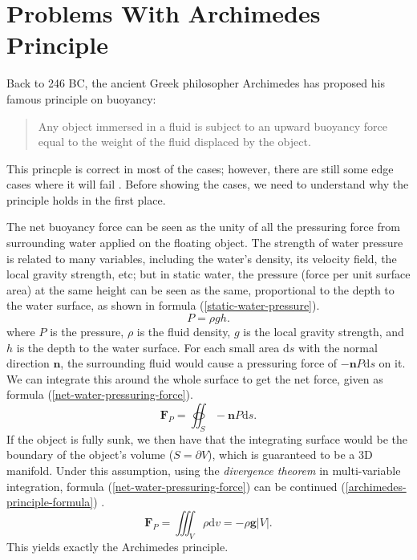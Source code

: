 \section{Problems With Archimedes Principle}

Back to 246 BC, the ancient Greek philosopher Archimedes has proposed his famous principle on buoyancy:
\begin{quote}
	Any object immersed in a fluid is subject to an upward buoyancy force equal to the weight of the fluid displaced by the object.
\end{quote}
This princple is correct in most of the cases;
however, there are still some edge cases where it will fail \cite{bierman2003reconsidering} \cite{mohazzab2017archimedes}.
Before showing the cases, we need to understand why the principle holds in the first place.

The net buoyancy force can be seen as the unity of all the pressuring force from surrounding water applied on the floating object.
The strength of water pressure is related to many variables, including the water's density, its velocity field, the local gravity strength, etc;
but in static water, the pressure (force per unit surface area) at the same height can be seen as the same, proportional to the depth to the water surface, as shown in formula (\ref{static-water-pressure}).
\begin{equation}
	P=\rho gh.
	\label{static-water-pressure}
\end{equation}
where $P$ is the pressure, $\rho$ is the fluid density, $g$ is the local gravity strength, and $h$ is the depth to the water surface.
For each small area $\mathrm{d}s$ with the normal direction $\mathbf n$, the surrounding fluid would cause a pressuring force of $-\mathbf nP\mathrm{d}s$ on it.
We can integrate this around the whole surface to get the net force, given as formula (\ref{net-water-pressuring-force}).
\begin{equation}
	\mathbf{F}_P=\oiint_{S}-\mathbf nP\mathrm{d}s.
	\label{net-water-pressuring-force}
\end{equation}
If the object is fully sunk, we then have that the integrating surface would be the boundary of the object's volume ($S=\partial V$), which is guaranteed to be a 3D manifold.
Under this assumption, using the \emph{divergence theorem} in multi-variable integration, formula (\ref{net-water-pressuring-force}) can be continued (\ref{archimedes-principle-formula}) \cite{pfeffer1986divergence}.
\begin{equation}
	\mathbf{F}_P=\iiint_{V}\rho\mathrm{d}v=-\rho\mathbf{g}|V|.
	\label{archimedes-principle-formula}
\end{equation}
This yields exactly the Archimedes principle.

